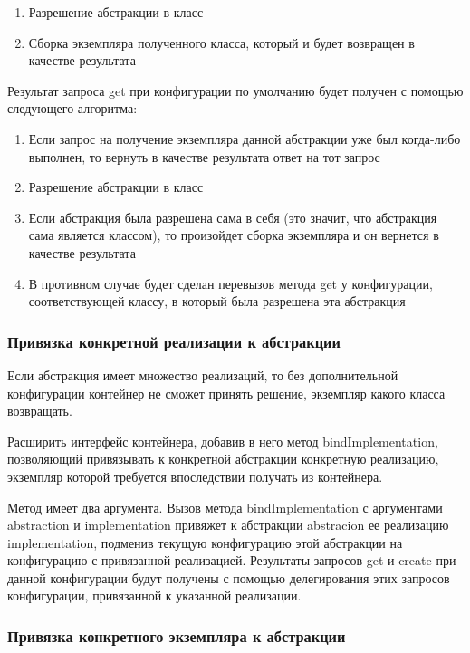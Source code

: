 \begin{enumerate}
	\item Разрешение абстракции в класс
	\item Сборка экземпляра полученного класса, который и будет возвращен в качестве результата
\end{enumerate}


Результат запроса get при конфигурации по умолчанию будет получен с помощью следующего алгоритма:

\begin{enumerate}
	\item Если запрос на получение экземпляра данной абстракции уже был когда-либо выполнен, то вернуть в качестве результата ответ на тот запрос
	\item Разрешение абстракции в класс
	\item Если абстракция была разрешена сама в себя (это значит, что абстракция сама является классом), то произойдет сборка экземпляра и он вернется в качестве результата
	\item В противном случае будет сделан перевызов метода get у конфигурации, соответствующей классу, в который была разрешена эта абстракция
\end{enumerate}


\subsubsection{Привязка конкретной реализации к абстракции}

Если абстракция имеет множество реализаций, то без дополнительной конфигурации контейнер не сможет принять решение, экземпляр какого класса возвращать.

\begin{solution}
	Расширить интерфейс контейнера, добавив в него метод bindImplementation, позволяющий привязывать к конкретной абстракции конкретную реализацию, 
	экземпляр которой требуется впоследствии получать из контейнера.
\end{solution}

Метод имеет два аргумента. Вызов  метода bindImplementation с аргументами abstraction и implementation привяжет к абстракции abstracion ее реализацию implementation,
подменив текущую конфигурацию этой абстракции на конфигурацию с привязанной реализацией.
Результаты запросов get и create при данной конфигурации будут получены с помощью делегирования этих запросов конфигурации, привязанной к указанной реализации.

\subsubsection{Привязка конкретного экземпляра к абстракции}


